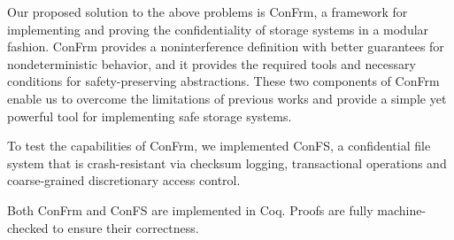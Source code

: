 Our proposed solution to the above problems is ConFrm, a framework for implementing and proving the confidentiality of storage systems in a modular fashion. ConFrm provides a noninterference definition with better guarantees for nondeterministic behavior, and it provides the required tools and necessary conditions for safety-preserving abstractions. These two components of ConFrm enable us to overcome the limitations of previous works and provide a simple yet powerful tool for implementing safe storage systems. 

To test the capabilities of ConFrm, we implemented ConFS, a confidential file system that is crash-resistant via checksum logging, transactional operations and coarse-grained discretionary access control. 

Both ConFrm and ConFS are implemented in Coq. Proofs are fully machine-checked to ensure their correctness.

